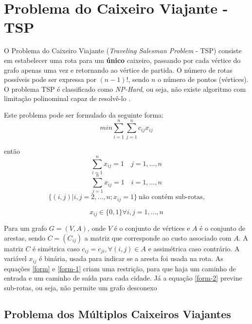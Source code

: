 \documentclass[12pt,openright,a4paper,oneside]{tcc}
\begin{document}
	
	\chapter{Problema do Caixeiro Viajante - TSP}
		O Problema do Caixeiro Viajante (\textit{Traveling Salesman Problem} - TSP) consiste em estabelecer uma rota para um \textbf{único} caixeiro, passando por cada vértice do grafo apenas uma vez e retornando ao vértice de partida. O número de rotas possíveis pode ser expressa por $(n-1)!$, sendo $n$ o número de pontos (vértices).
		O problema TSP é classificado como \textit{NP-Hard}\cite{0015-pdf}, ou seja, não existe algoritmo com limitação polinominal capaz de resolvê-lo \cite{0010-pdf}. 
		
		Este problema pode ser formulado da seguinte forma:
		\begin{equation}
 		   	min\sum_{i=1}^{n} \sum_{j=1}^{n} c_{ij} x_{ij}
		\end{equation}
		
		então		
		\begin{equation}
			\label{form}
 		   	\sum_{i=1}^{n} x_{ij} = 1 \quad j=1,\dots,n
		\end{equation}
		\begin{equation}
			\label{form-1}
 		   	\sum_{j=1}^{n} x_{ij} = 1 \quad i=1,\dots,n
		\end{equation}
		\begin{equation}
		\label{form-2}
 		   	\{(i,j)|i,j=2,\dots,n; x_{ij}=1\} ~\text{não contém sub-rotas,}
		\end{equation}
		
		\begin{equation}
		\label{form-3}
 		   	x_{ij} \in \{0,1\}\forall i,j=1,\dots,n
		\end{equation}
		
			
		Para um grafo  $G=(V,A)$, onde $V$ é o conjunto de vértices e $A$  é o conjunto de arestas, sendo $C = (C_{ij})$ a matriz que corresponde ao custo associado com $A$. A matriz $C$ é simétrica caso $c_{ij}=c_{ji},\forall(i,j) \in A$ e assimétrica caso contrário. A variável $x_{ij}$ é binária, usada para indicar se a aresta foi usada na rota. As equações \ref{form} e \ref{form-1} criam uma restrição, para que haja um caminho de entrada e um caminho de saída para cada cidade. Já a equação \ref{form-2} previne sub-rotas, ou seja, não permite um grafo desconexo \cite{dissertation}
	
	\section{Problema dos Múltiplos Caixeiros Viajantes}
\end{document}
